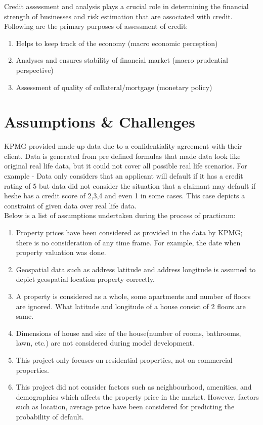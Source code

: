 Credit assessment and analysis plays a crucial role in determining the financial strength of businesses and risk estimation that are associated with credit. Following are the primary purposes of assessment of credit:
\begin{enumerate}
\item Helps to keep track of the economy (macro economic perception) 
\item Analyses and ensures stability of financial market (macro prudential perspective)
\item Assessment of quality of collateral/mortgage (monetary policy)
\end{enumerate}

\section{Assumptions \& Challenges}

KPMG provided made up data due to a confidentiality agreement with their client. Data is generated from pre defined formulas that made data look like original real life data, but it could not cover all possible real life scenarios. For example - Data only considers that an applicant will default if it has a credit rating of 5 but data did not consider the situation that a claimant may default if he\/she has a credit score of 2,3,4 and even 1 in some cases. This case depicts a constraint of given data over real life data.\\

Below is a list of assumptions undertaken during the process of practicum:
\begin{enumerate}
\item Property prices have been considered as provided in the data by KPMG; there is no consideration of any time frame. For example, the date when property valuation was done. 
\item Geospatial data such as address latitude and address longitude is assumed to depict geospatial location property correctly.
\item A property is considered as a whole, some apartments and number of floors are ignored. What latitude and longitude of a house consist of 2 floors are same.
\item Dimensions of house and size of the house(number of rooms, bathrooms, lawn, etc.) are not considered during model development.
\item This project only focuses on residential properties, not on commercial properties. 
\item This project did not consider factors such as neighbourhood, amenities, and demographics which affects the property price in the market. However, factors such as location, average price have been considered for predicting the probability of default.
\end{enumerate}

